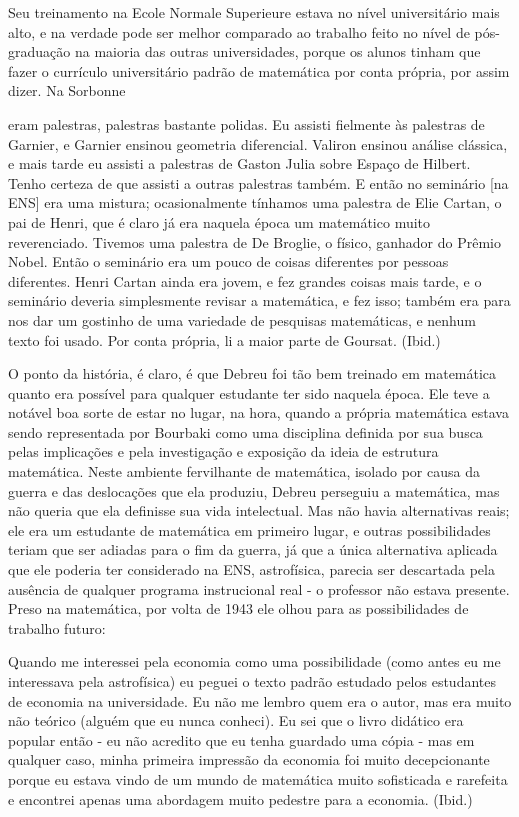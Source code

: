 \documentclass[12pt]{article}
\begin{document}
Seu treinamento na Ecole Normale Superieure estava no nível universitário mais alto, e na verdade pode ser melhor comparado ao trabalho feito no nível de pós-graduação na maioria das outras universidades, porque os alunos tinham que fazer o currículo universitário padrão de matemática por conta própria, por assim dizer. Na Sorbonne

eram palestras, palestras bastante polidas. Eu assisti fielmente às palestras de Garnier, e Garnier ensinou geometria diferencial. Valiron ensinou análise clássica, e mais tarde eu assisti a palestras de Gaston Julia sobre Espaço de Hilbert. Tenho certeza de que assisti a outras palestras também. E então no seminário [na ENS] era uma mistura; ocasionalmente tínhamos uma palestra de Elie Cartan, o pai de Henri, que é claro já era naquela época um matemático muito reverenciado. Tivemos uma palestra de De Broglie, o físico, ganhador do Prêmio Nobel. Então o seminário era um pouco de coisas diferentes por pessoas diferentes. Henri Cartan ainda era jovem, e fez grandes coisas mais tarde, e o seminário deveria simplesmente revisar a matemática, e fez isso; também era para nos dar um gostinho de uma variedade de pesquisas matemáticas, e nenhum texto foi usado. Por conta própria, li a maior parte de Goursat. (Ibid.)

O ponto da história, é claro, é que Debreu foi tão bem treinado em matemática quanto era possível para qualquer estudante ter sido naquela época. Ele teve a notável boa sorte de estar no lugar, na hora, quando a própria matemática estava sendo representada por Bourbaki como uma disciplina definida por sua busca pelas implicações e pela investigação e exposição da ideia de estrutura matemática. Neste ambiente fervilhante de matemática, isolado por causa da guerra e das deslocações que ela produziu, Debreu perseguiu a matemática, mas não queria que ela definisse sua vida intelectual. Mas não havia alternativas reais; ele era um estudante de matemática em primeiro lugar, e outras possibilidades teriam que ser adiadas para o fim da guerra, já que a única alternativa aplicada que ele poderia ter considerado na ENS, astrofísica, parecia ser descartada pela ausência de qualquer programa instrucional real - o professor não estava presente. Preso na matemática, por volta de 1943 ele olhou para as possibilidades de trabalho futuro:

Quando me interessei pela economia como uma possibilidade (como antes eu me interessava pela astrofísica) eu peguei o texto padrão estudado pelos estudantes de economia na universidade. Eu não me lembro quem era o autor, mas era muito não teórico (alguém que eu nunca conheci). Eu sei que o livro didático era popular então - eu não acredito que eu tenha guardado uma cópia - mas em qualquer caso, minha primeira impressão da economia foi muito decepcionante porque eu estava vindo de um mundo de matemática muito sofisticada e rarefeita e encontrei apenas uma abordagem muito pedestre para a economia. (Ibid.)
\end{document}
